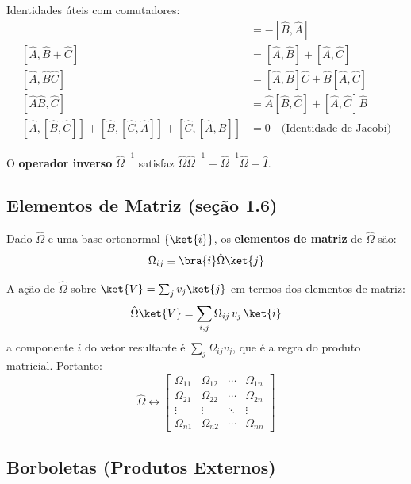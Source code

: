 Identidades úteis com comutadores:
\begin{align}
    [\hat{A}, \hat{B}] &= -[\hat{B}, \hat{A}] \\
    [\hat{A}, \hat{B} + \hat{C}] &= [\hat{A}, \hat{B}] + [\hat{A}, \hat{C}] \\
    [\hat{A}, \hat{B}\hat{C}] &= [\hat{A}, \hat{B}]\hat{C} + \hat{B}[\hat{A}, \hat{C}] \\
    [\hat{A}\hat{B}, \hat{C}] &= \hat{A}[\hat{B}, \hat{C}] + [\hat{A}, \hat{C}]\hat{B} \\
    [\hat{A}, [\hat{B}, \hat{C}]] + [\hat{B}, [\hat{C}, \hat{A}]] + [\hat{C}, [\hat{A}, \hat{B}]] &= 0
    \quad \text{(Identidade de Jacobi)}
\end{align}

O \textbf{operador inverso} $\hat{\Omega}^{-1}$ satisfaz $\hat{\Omega}\hat{\Omega}^{-1} = \hat{\Omega}^{-1}\hat{\Omega} = \hat{I}$.

\subsection*{Elementos de Matriz (seção 1.6)}

Dado $\hat{\Omega}$ e uma base ortonormal $\{\ket{i}\}$, os \textbf{elementos de matriz} de $\hat{\Omega}$ são:
\begin{equation}
    \Omega_{ij} \equiv \bra{i}\hat{\Omega}\ket{j}
\end{equation}

A ação de $\hat{\Omega}$ sobre $\ket{V} = \sum_j v_j\ket{j}$ em termos dos elementos de matriz:
\begin{equation}
    \hat{\Omega}\ket{V} = \sum_{i,j} \Omega_{ij}\, v_j\,\ket{i}
\end{equation}
a componente $i$ do vetor resultante é $\sum_j \Omega_{ij} v_j$, que é a regra do produto matricial. Portanto:
\begin{equation}
    \hat{\Omega} \leftrightarrow \begin{bmatrix}
        \Omega_{11} & \Omega_{12} & \cdots & \Omega_{1n} \\
        \Omega_{21} & \Omega_{22} & \cdots & \Omega_{2n} \\
        \vdots & \vdots & \ddots & \vdots \\
        \Omega_{n1} & \Omega_{n2} & \cdots & \Omega_{nn}
    \end{bmatrix}
\end{equation}

\subsection*{Borboletas (Produtos Externos)}

